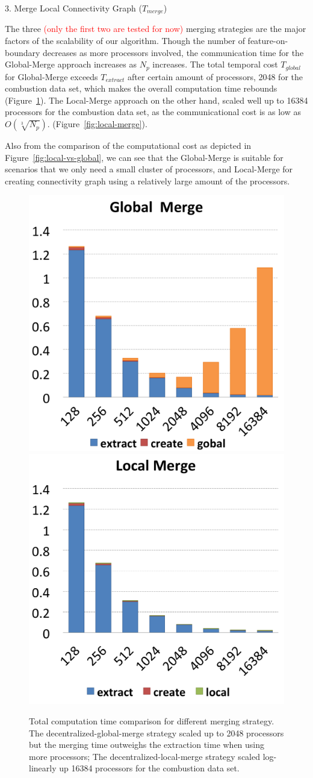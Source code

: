 \documentclass[10pt, conference, compsocconf]{IEEEtran}
\begin{document}
3. Merge Local Connectivity Graph ($T_{merge}$)

The three \textcolor{red}{(only the first two are tested for now)} merging strategies are the major factors of the scalability of our algorithm. Though the number of feature-on-boundary decreases as more processors involved, the communication time for the Global-Merge approach increases as $N_p$ increases. The total temporal cost $T_{global}$ for Global-Merge exceeds $T_{extract}$ after certain amount of processors, 2048 for the combustion data set, which makes the overall computation time rebounds (Figure~\ref{fig:global-merge}). The Local-Merge approach on the other hand, scaled well up to 16384 processors for the combustion data set, as the communicational cost is as low as ${O(\sqrt[3]{N_p})}$. (Figure~\ref{fig:local-merge}).

Also from the comparison of the computational cost as depicted in Figure~\ref{fig:local-vs-global}, we can see that the Global-Merge is suitable for scenarios that we only need a small cluster of processors, and Local-Merge for creating connectivity graph using a relatively large amount of the processors.

\begin{figure}[ht]
	\centering
	\includegraphics[width=0.45\linewidth]{global_merge.png}
	\includegraphics[width=0.45\linewidth]{local_merge.png}
	\caption{Total computation time comparison for different merging strategy. The decentralized-global-merge strategy scaled up to 2048 processors but the merging time outweighs the extraction time when using more processors; The decentralized-local-merge strategy scaled log-linearly up 16384 processors for the combustion data set.}
	\label{fig:global-merge}
\end{figure}
\end{document}
